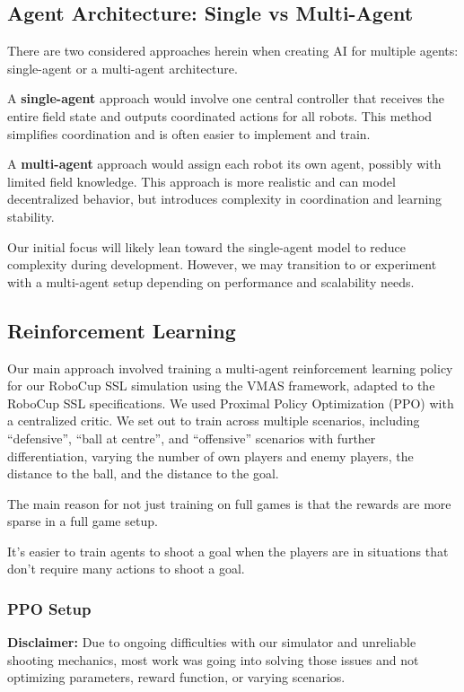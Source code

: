 \subsection{Agent Architecture: Single vs Multi-Agent}

There are two considered approaches herein when creating AI for multiple agents: single-agent or a multi-agent architecture.

A \textbf{single-agent} approach would involve one central controller that receives the entire field state and outputs coordinated actions for all robots. This method simplifies coordination and is often easier to implement and train.

A \textbf{multi-agent} approach would assign each robot its own agent, possibly with limited field knowledge. This approach is more realistic and can model decentralized behavior, but introduces complexity in coordination and learning stability.

Our initial focus will likely lean toward the single-agent model to reduce complexity during development. However, we may transition to or experiment with a multi-agent setup depending on performance and scalability needs.

\subsection{Reinforcement Learning}
Our main approach involved training a multi-agent reinforcement learning policy for our RoboCup SSL simulation using the VMAS framework, adapted to the RoboCup SSL specifications.  
We used Proximal Policy Optimization (PPO) with a centralized critic.  
We set out to train across multiple scenarios, including ``defensive'', ``ball at centre'', and ``offensive'' scenarios with further differentiation, varying the number of own players and enemy players, the distance to the ball, and the distance to the goal.

The main reason for not just training on full games is that the rewards are more sparse in a full game setup.

It's easier to train agents to shoot a goal when the players are in situations that don't require many actions to shoot a goal.

\subsubsection{PPO Setup}
\textbf{Disclaimer:} Due to ongoing difficulties with our simulator and unreliable shooting mechanics, most work was going into solving those issues and not optimizing parameters, reward function, or varying scenarios.

